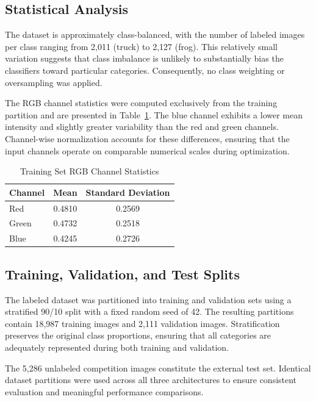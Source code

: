 \documentclass[conference]{IEEEtran}
\begin{document}
\subsection{Statistical Analysis}

The dataset is approximately class-balanced, with the
number of labeled images per class ranging from 2,011
(truck) to 2,127 (frog). This relatively small variation
suggests that class imbalance is unlikely to substantially
bias the classifiers toward particular categories.
Consequently, no class weighting or oversampling was applied.

The RGB channel statistics were computed exclusively from
the training partition and are presented in
Table~\ref{tab:channel_statistics}. The blue channel exhibits
a lower mean intensity and slightly greater variability
than the red and green channels. Channel-wise normalization
accounts for these differences, ensuring that the input
channels operate on comparable numerical scales during
optimization.

\begin{table}[htbp]
    \centering
    \caption{Training Set RGB Channel Statistics}
    \label{tab:channel_statistics}
    \begin{tabular}{lcc}
        \toprule
        Channel & Mean & Standard Deviation \\
        \midrule
        Red   & 0.4810 & 0.2569 \\
        Green & 0.4732 & 0.2518 \\
        Blue  & 0.4245 & 0.2726 \\
        \bottomrule
    \end{tabular}
\end{table}

\subsection{Training, Validation, and Test Splits}

The labeled dataset was partitioned into training and
validation sets using a stratified 90/10 split with a
fixed random seed of 42. The resulting partitions contain
18,987 training images and 2,111 validation images.
Stratification preserves the original class proportions,
ensuring that all categories are adequately represented
during both training and validation.

The 5,286 unlabeled competition images constitute the
external test set. Identical dataset partitions were used
across all three architectures to ensure consistent
evaluation and meaningful performance comparisons.
\end{document}
